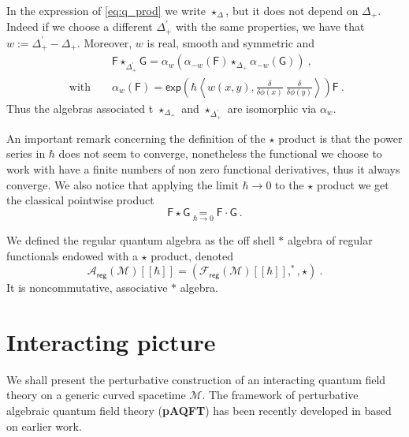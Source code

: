 \documentclass[12pt]{book}
\newcommand{\reg}{\mathsf{reg}}
\renewcommand{\exp}{\mathsf{exp}}
\newcommand{\sm}[1]{\left\langle#1\right\rangle}
\newcommand{\Acal}{\mathcal{A}}
\newcommand{\Fcal}{\mathcal{F}}
\newcommand{\Mcal}{\mathcal{M}}
\newcommand{\Fsf}{\mathsf{F}}
\newcommand{\Gsf}{\mathsf{G}}
\theoremstyle{break}
\begin{document}
In the expression of \eqref{eq:q_prod} we write $\star_\Delta$, but it does not depend on $\Delta_+$. Indeed if we choose a different $\Delta^\prime_+$ with the same properties, we have that $w:=\Delta^\prime_+ - \Delta_+$. Moreover, $w$ is real, smooth and symmetric and
%
\begin{eqnarray*}
&& \Fsf \star_{\Delta^\prime_+} \Gsf = \alpha_w \left(\alpha_{-w}(\Fsf) \star_{\Delta_+} \alpha_{-w}(\Gsf)\right) \ , \\[6pt]
\mbox{ with } && \alpha_{w}(\Fsf) = \exp\left(\hbar \sm{ w(x,y) , \frac{\delta}{\delta\phi(x)} \ \frac{\delta}{\delta\phi(y)} } \right) \Fsf \ .
\end{eqnarray*}
%
Thus the algebras associated t $\star_{\Delta_+}$ and $\star_{\Delta^\prime_+}$ are isomorphic via $\alpha_{w}$. 




An important remark concerning the definition of the $\star$ product is that the power series in $\hbar$ does not seem to converge, nonetheless the functional we choose to work with have a finite numbers of non zero functional derivatives, thus it always converge. We also notice that applying the limit $\hbar \to 0$ to the $\star$ product we get the classical pointwise product
%
\begin{equation*}
\Fsf \star \Gsf \underset{\hbar \to 0}{=} \Fsf \cdot \Gsf \ . 
\end{equation*}


We defined the regular quantum algebra as the off shell $\ast$ algebra of regular functionals endowed with a $\star$ product, denoted
%
\begin{equation*}
\Acal_\reg(\Mcal)[[\hbar]] = \left(\Fcal_\reg(\Mcal)[[\hbar]] , ^\ast , \star \right) \ . 
\end{equation*}
%
It is noncommutative, associative $\ast$ algebra.


\section{Interacting picture}


We shall present the perturbative construction of an interacting quantum field theory on a generic curved spacetime $\Mcal$. The framework of perturbative algebraic quantum field theory (\textbf{pAQFT}) has been recently developed in \cite{brunetti_perturbative_2009,fredenhagen_perturbative_2015,fredenhagen_batalin-vilkovisky_2013} based on earlier work.
\end{document}
